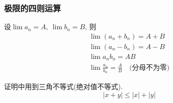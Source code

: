 \subsubsection{极限的四则运算}
\begin{theorem}
    设$\lim a_n = A, \ \lim b_n = B$, 则
    \begin{gather}
      \lim (a_n + b_n ) = A + B
      \\
      \lim (a_n - b_n ) = A - B
      \\
      \lim a_n  b_n  = A  B
      \\
      \lim  \frac{a_n}{b_n} = \frac{A}{B}\quad \text{(分母不为零)}
    \end{gather}
\end{theorem}
证明中用到三角不等式(绝对值不等式).
\begin{equation}
  |x+y| \le |x| + |y|
\end{equation}
